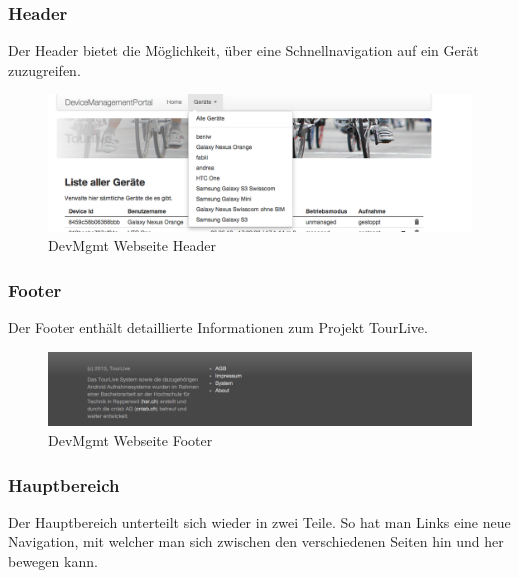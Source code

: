 \subsubsection{Header}
Der Header bietet die Möglichkeit, über eine Schnellnavigation auf ein Gerät zuzugreifen. 
\begin{figure}[H]
	\centering
	\includegraphics[width=120mm]{images/devmgmtsrv/header.png}
	\caption{DevMgmt Webseite Header}
\end{figure}



\pagebreak
\subsubsection{Footer}
Der Footer enthält detaillierte Informationen zum Projekt TourLive. 
 
\begin{figure}[H]
	\centering
	\includegraphics[width=120mm]{images/devmgmtsrv/footer.png}
	\caption{DevMgmt Webseite Footer}
\end{figure}


\subsubsection{Hauptbereich}
Der Hauptbereich unterteilt sich wieder in zwei Teile. So hat man Links eine neue Navigation, mit welcher man sich zwischen den verschiedenen Seiten hin und her bewegen kann. 
 
